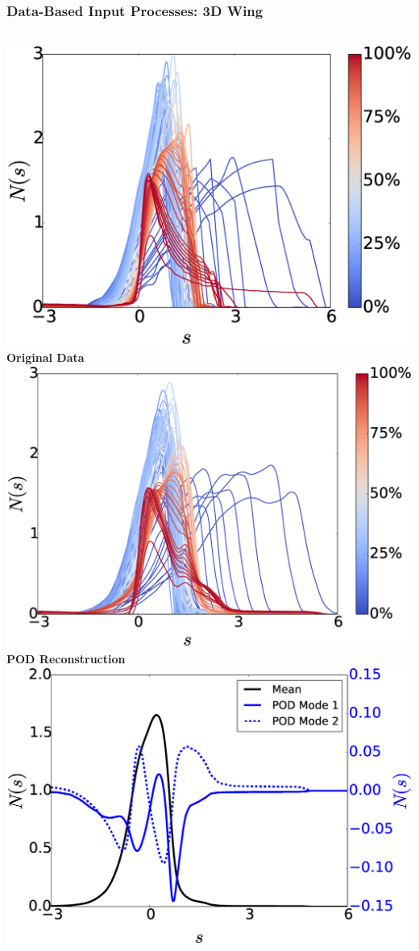 \documentclass[9pt]{beamer}
\begin{document}
\begin{frame}
\frametitle{Data-Based Input Processes: 3D Wing}
\label{sec-2-3}

\begin{columns}[c]
    \centering
    \includegraphics[width=1.3\textwidth]{HornsUnaligned} \\
    \bf{Original Data}
    \centering
    \includegraphics[width=1.25\textwidth]{PODReconstruction2} \\
    {\bf POD Reconstruction}
    \centering
    \includegraphics[width=1.25\textwidth]{PODModes} \\

\end{columns}
\end{frame}
\end{document}

